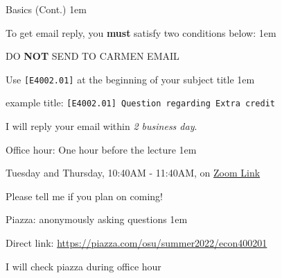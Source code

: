 \documentclass[11pt,aspectratio=43]{beamer}
\let\olditemize=\itemize
\let\endolditemize=\enditemize
\renewenvironment{itemize}{\olditemize \itemsep1em}{\endolditemize}
\let\oldenumerate=\enumerate
\let\endoldenumerate=\endenumerate
\renewenvironment{enumerate}{\oldenumerate \itemsep1em}{ \endoldenumerate}
\theoremstyle{definition}
\begin{document}
\begin{frame}{Basics (Cont.)}
\label{slide:Basics__Cont__}
    \begin{itemize}
        \item To get email reply, you \textbf{must} satisfy two conditions below:
        \begin{enumerate}
            \item \alert{DO \textbf{NOT} SEND TO CARMEN EMAIL}
            \item \alert{Use \texttt{[E4002.01]} at the beginning of your subject title}
            \begin{itemize}
                \item example title: \texttt{[E4002.01] Question regarding Extra credit}
            \end{itemize}
        \end{enumerate}
        \item I will reply your email within \textit{2 business day}.
        \item Office hour: One hour before the lecture
        \begin{itemize}
            \item Tuesday and Thursday, 10:40AM - 11:40AM, on \href{https://osu.zoom.us/j/95172261996?pwd=bHVuRlU5dHlmSUx5STcycDBkOVdpZz09}{Zoom Link}
            \item Please tell me if you plan on coming!
        \end{itemize}
        \item Piazza: anonymously asking questions
        \begin{itemize}
            \item Direct link: \href{https://piazza.com/osu/summer2022/econ400201}{https://piazza.com/osu/summer2022/econ400201}
            \item I will check piazza during office hour
        \end{itemize}
    \end{itemize}
\end{frame}
\end{document}
